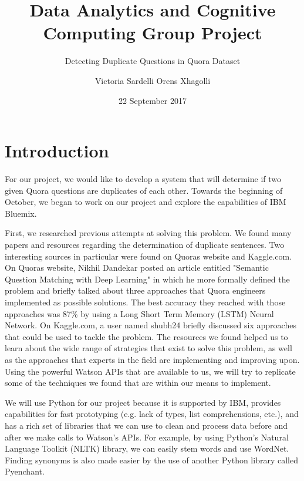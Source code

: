 \documentclass{sig-alternate}
\begin{document}
\title{Data Analytics and Cognitive Computing Group Project}
\subtitle{Detecting Duplicate Questions in Quora Dataset}
\author{
\alignauthor
Victoria Sardelli
\alignauthor
Orens Xhagolli
}
\date{22 September 2017}
\maketitle

\section{Introduction}
\label{introduction}
For our project, we would like to develop a system that will determine if two given Quora questions are duplicates of each other. Towards the beginning of October, we began to work on our project and explore the capabilities of IBM Bluemix.

First, we researched previous attempts at solving this problem. We found many papers and resources regarding the determination of duplicate sentences. Two interesting sources in particular were found on Quora\textsc{}s website and Kaggle.com. On Quora\textsc{}s website, Nikhil Dandekar posted an article entitled "Semantic Question Matching with Deep Learning" in which he more formally defined the problem and briefly talked about three approaches that Quora engineers implemented as possible solutions. The best accuracy they reached with those approaches was 87\% by using a Long Short Term Memory (LSTM) Neural Network. On Kaggle.com, a user named shubh24 briefly discussed six approaches that could be used to tackle the problem. The resources we found helped us to learn about the wide range of strategies that exist to solve this problem, as well as the approaches that experts in the field are implementing and improving upon. Using the powerful Watson APIs that are available to us, we will try to replicate some of the techniques we found that are within our means to implement.

We will use Python for our project because it is supported by IBM, provides capabilities for fast prototyping (e.g. lack of types, list comprehensions, etc.), and has a rich set of libraries that we can use to clean and process data before and after we make calls to Watson's APIs. For example, by using Python's Natural Language Toolkit (NLTK) library, we can easily stem words and use WordNet. Finding synonyms is also made easier by the use of another Python library called Pyenchant.
\end{document}
